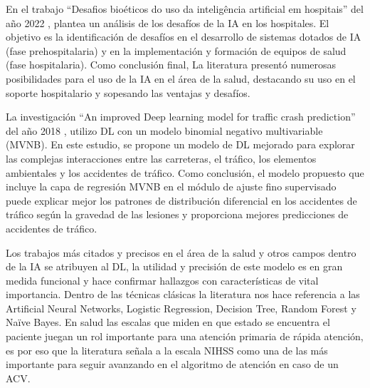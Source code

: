 \par En el trabajo “Desafios bioéticos do uso da inteligência artificial em hospitais” del año 2022 \cite{Bioetica2022}, plantea un análisis de los desafíos de la IA en los hospitales. El objetivo es la identificación de desafíos en el desarrollo de sistemas dotados de IA (fase prehospitalaria) y en la implementación y formación de equipos de salud (fase hospitalaria). Como conclusión final, La literatura presentó numerosas posibilidades para el uso de la IA en el área de la salud, destacando su uso en el soporte hospitalario y sopesando las ventajas y desafíos.\\

\par La investigación “An improved Deep learning model for traffic crash prediction” del año 2018 \cite{shao2018improved}, utilizo DL con un modelo binomial negativo multivariable (MVNB). En este estudio, se propone un modelo de DL mejorado para explorar las complejas interacciones entre las carreteras, el tráfico, los elementos ambientales y los accidentes de tráfico. Como conclusión, el modelo propuesto que incluye la capa de regresión MVNB en el módulo de ajuste fino supervisado puede explicar mejor los patrones de distribución diferencial en los accidentes de tráfico según la gravedad de las lesiones y proporciona mejores predicciones de accidentes de tráfico.\\

\par Los trabajos más citados y precisos en el área de la salud y otros campos dentro de la IA se atribuyen al DL, la utilidad y precisión de este modelo es en gran medida funcional y hace confirmar hallazgos con características de vital importancia. Dentro de las técnicas clásicas la literatura nos hace referencia a las Artificial Neural Networks, Logistic Regression, Decision Tree, Random Forest y Naïve Bayes. En salud las escalas que miden en que estado se encuentra el paciente juegan un rol importante para una atención primaria de rápida atención, es por eso que la literatura señala a la escala NIHSS como una de las más importante para seguir avanzando en el algoritmo de atención en caso de un ACV.\\

